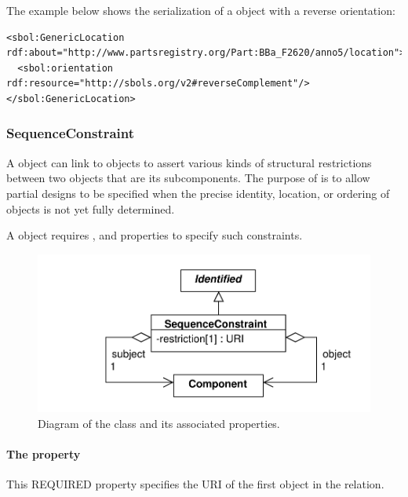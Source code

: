The example below shows the serialization of a  object with a reverse orientation:
\begin{lstlisting}
<sbol:GenericLocation rdf:about="http://www.partsregistry.org/Part:BBa_F2620/anno5/location">
  <sbol:orientation rdf:resource="http://sbols.org/v2#reverseComplement"/>
</sbol:GenericLocation>
\end{lstlisting}

\subsubsection{SequenceConstraint}
\label{sec:SequenceConstraint}
A  object can link to  objects to assert various kinds of structural restrictions between two  objects that are its subcomponents. 
The purpose of  is to allow partial designs to be specified when the precise identity, location, or ordering of  objects is not yet fully determined.

A  object requires ,  and  properties to specify such constraints.

\begin{figure}[ht]
\begin{center}
\includegraphics[scale=0.6]{uml/sequence_constraint}
\caption[]{Diagram of the  class and its associated properties.}
\label{uml:sequence_constraint}
\end{center}
\end{figure}

\paragraph{The  property}\label{sec:subject}
\label{sec:subject}
This REQUIRED property specifies the URI of the first  object in the relation.

